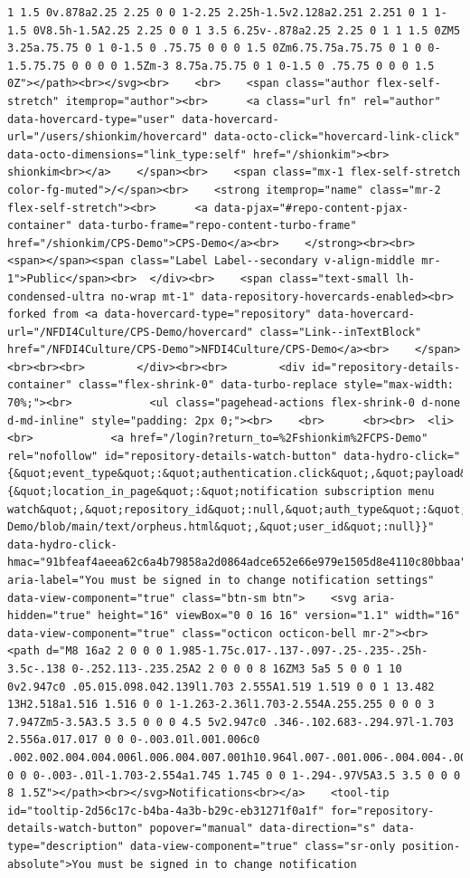\documentclass[
  letterpaper,
]{book}
\begin{document}
\begin{verbatim}
1 1.5 0v.878a2.25 2.25 0 0 1-2.25 2.25h-1.5v2.128a2.251 2.251 0 1 1-1.5 0V8.5h-1.5A2.25 2.25 0 0 1 3.5 6.25v-.878a2.25 2.25 0 1 1 1.5 0ZM5 3.25a.75.75 0 1 0-1.5 0 .75.75 0 0 0 1.5 0Zm6.75.75a.75.75 0 1 0 0-1.5.75.75 0 0 0 0 1.5Zm-3 8.75a.75.75 0 1 0-1.5 0 .75.75 0 0 0 1.5 0Z"></path><br></svg><br>    <br>    <span class="author flex-self-stretch" itemprop="author"><br>      <a class="url fn" rel="author" data-hovercard-type="user" data-hovercard-url="/users/shionkim/hovercard" data-octo-click="hovercard-link-click" data-octo-dimensions="link_type:self" href="/shionkim"><br>        shionkim<br></a>    </span><br>    <span class="mx-1 flex-self-stretch color-fg-muted">/</span><br>    <strong itemprop="name" class="mr-2 flex-self-stretch"><br>      <a data-pjax="#repo-content-pjax-container" data-turbo-frame="repo-content-turbo-frame" href="/shionkim/CPS-Demo">CPS-Demo</a><br>    </strong><br><br>    <span></span><span class="Label Label--secondary v-align-middle mr-1">Public</span><br>  </div><br>    <span class="text-small lh-condensed-ultra no-wrap mt-1" data-repository-hovercards-enabled><br>      forked from <a data-hovercard-type="repository" data-hovercard-url="/NFDI4Culture/CPS-Demo/hovercard" class="Link--inTextBlock" href="/NFDI4Culture/CPS-Demo">NFDI4Culture/CPS-Demo</a><br>    </span><br><br><br>        </div><br><br>        <div id="repository-details-container" class="flex-shrink-0" data-turbo-replace style="max-width: 70%;"><br>            <ul class="pagehead-actions flex-shrink-0 d-none d-md-inline" style="padding: 2px 0;"><br>    <br>      <br><br>  <li><br>            <a href="/login?return_to=%2Fshionkim%2FCPS-Demo" rel="nofollow" id="repository-details-watch-button" data-hydro-click="{&quot;event_type&quot;:&quot;authentication.click&quot;,&quot;payload&quot;:{&quot;location_in_page&quot;:&quot;notification subscription menu watch&quot;,&quot;repository_id&quot;:null,&quot;auth_type&quot;:&quot;LOG_IN&quot;,&quot;originating_url&quot;:&quot;https://github.com/shionkim/CPS-Demo/blob/main/text/orpheus.html&quot;,&quot;user_id&quot;:null}}" data-hydro-click-hmac="91bfeaf4aeea62c6a4b79858a2d0864adce652e66e979e1505d8e4110c80bbaa" aria-label="You must be signed in to change notification settings" data-view-component="true" class="btn-sm btn">    <svg aria-hidden="true" height="16" viewBox="0 0 16 16" version="1.1" width="16" data-view-component="true" class="octicon octicon-bell mr-2"><br>    <path d="M8 16a2 2 0 0 0 1.985-1.75c.017-.137-.097-.25-.235-.25h-3.5c-.138 0-.252.113-.235.25A2 2 0 0 0 8 16ZM3 5a5 5 0 0 1 10 0v2.947c0 .05.015.098.042.139l1.703 2.555A1.519 1.519 0 0 1 13.482 13H2.518a1.516 1.516 0 0 1-1.263-2.36l1.703-2.554A.255.255 0 0 0 3 7.947Zm5-3.5A3.5 3.5 0 0 0 4.5 5v2.947c0 .346-.102.683-.294.97l-1.703 2.556a.017.017 0 0 0-.003.01l.001.006c0 .002.002.004.004.006l.006.004.007.001h10.964l.007-.001.006-.004.004-.006.001-.007a.017.017 0 0 0-.003-.01l-1.703-2.554a1.745 1.745 0 0 1-.294-.97V5A3.5 3.5 0 0 0 8 1.5Z"></path><br></svg>Notifications<br></a>    <tool-tip id="tooltip-2d56c17c-b4ba-4a3b-b29c-eb31271f0a1f" for="repository-details-watch-button" popover="manual" data-direction="s" data-type="description" data-view-component="true" class="sr-only position-absolute">You must be signed in to change notification 
\end{verbatim}
\end{document}
